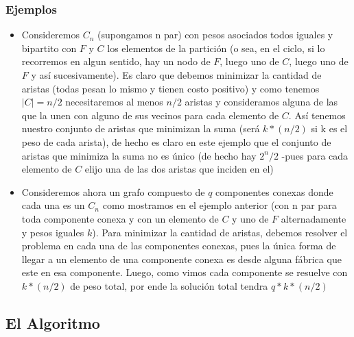 \documentclass[A4paper,oneside,fleqn,11pt]{article}
\theoremstyle{definition}
\begin{document}
\subsubsection{Ejemplos}

\begin{itemize}
\item Consideremos $C_{n}$ (supongamos n par) con pesos asociados todos iguales y bipartito con $F$ y $C$ los elementos de la partición (o sea, en el ciclo, si lo recorremos en algun sentido, hay un nodo de $F$, luego uno de $C$, luego uno de $F$ y así sucesivamente). Es claro que debemos minimizar la cantidad de aristas (todas pesan lo mismo y tienen costo positivo) y como tenemos $|C|=n/2$ necesitaremos al menos $n/2$ aristas y consideramos alguna de las que la unen con alguno de sus vecinos para cada elemento de $C$. Así tenemos nuestro conjunto de aristas que minimizan la suma (será $k*(n/2)$ si k es el peso de cada arista), de hecho es claro en este ejemplo que el conjunto de aristas que minimiza la suma no es único (de hecho hay $2^n/2$ -pues para cada elemento de $C$ elijo una de las dos aristas que inciden en el)

\item Consideremos ahora un grafo compuesto de $q$ componentes conexas donde cada una es un $C_{n}$ como mostramos en el ejemplo anterior (con n par para toda componente conexa y con un elemento de $C$ y uno de $F$ alternadamente y pesos iguales $k$). Para minimizar la cantidad de aristas, debemos resolver el problema en cada una de las componentes conexas, pues la única forma de llegar a un elemento de una componente conexa es desde alguna fábrica que este en esa componente. Luego, como vimos cada componente se resuelve con $k*(n/2)$ de peso total, por ende la solución total tendra $q*k*(n/2)$
\end{itemize}

\subsection{El Algoritmo}
\end{document}
